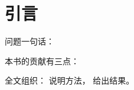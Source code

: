 \section{引言}
\label{sec:intro}


问题一句话：

本书的贡献有三点：

\begin{contributions}
  \item {}
  \item {}
  \item {}
\end{contributions}

全文组织： 说明方法， 给出结果。
